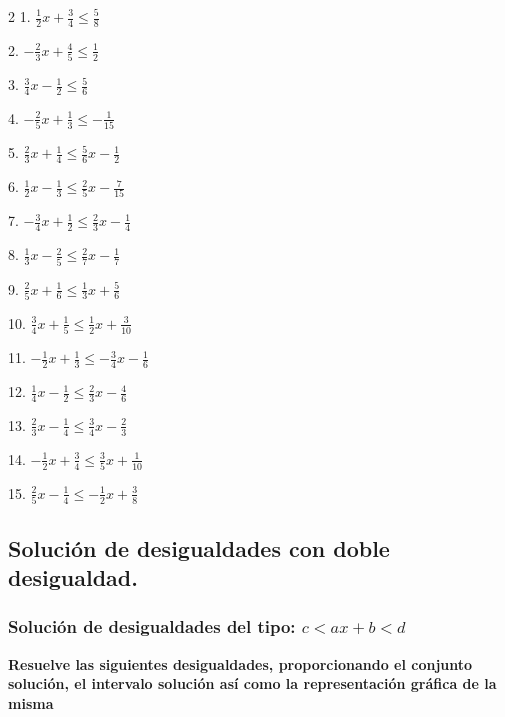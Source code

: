 \documentclass[12pt]{article}
\begin{document}
\begin{multicols}{2}
1. $\frac{1}{2}x + \frac{3}{4} \leq \frac{5}{8}$

2. $-\frac{2}{3}x + \frac{4}{5} \leq \frac{1}{2}$

3. $\frac{3}{4}x - \frac{1}{2} \leq \frac{5}{6}$

4. $-\frac{2}{5}x + \frac{1}{3} \leq -\frac{1}{15}$

5. $\frac{2}{3}x + \frac{1}{4} \leq \frac{5}{6}x - \frac{1}{2}$

6. $\frac{1}{2}x - \frac{1}{3} \leq \frac{2}{5}x - \frac{7}{15}$

7. $-\frac{3}{4}x + \frac{1}{2} \leq \frac{2}{3}x - \frac{1}{4}$

8. $\frac{1}{3}x - \frac{2}{5} \leq \frac{2}{7}x - \frac{1}{7}$

9. $\frac{2}{5}x + \frac{1}{6} \leq \frac{1}{3}x + \frac{5}{6}$

10. $\frac{3}{4}x + \frac{1}{5} \leq \frac{1}{2}x + \frac{3}{10}$

11. $-\frac{1}{2}x + \frac{1}{3} \leq -\frac{3}{4}x - \frac{1}{6}$

12. $\frac{1}{4}x - \frac{1}{2} \leq \frac{2}{3}x - \frac{4}{6}$

13. $\frac{2}{3}x - \frac{1}{4} \leq \frac{3}{4}x - \frac{2}{3}$

14. $-\frac{1}{2}x + \frac{3}{4} \leq \frac{3}{5}x + \frac{1}{10}$

15. $\frac{2}{5}x - \frac{1}{4} \leq -\frac{1}{2}x + \frac{3}{8}$

\end{multicols}

\subsection{Solución de desigualdades con doble
desigualdad.}\label{soluciuxf3n-de-desigualdades-con-doble-desigualdad.}
\subsubsection{\texorpdfstring{Solución de desigualdades del tipo:
\(c< ax+b <d\)}{Solución de desigualdades del tipo: c\textless{} ax+b \textless d}}\label{soluciuxf3n-de-desigualdades-del-tipo-c-axb-d}
\textbf{Resuelve las siguientes desigualdades, proporcionando el
conjunto solución, el intervalo solución así como la representación
gráfica de la misma}
\end{document}
